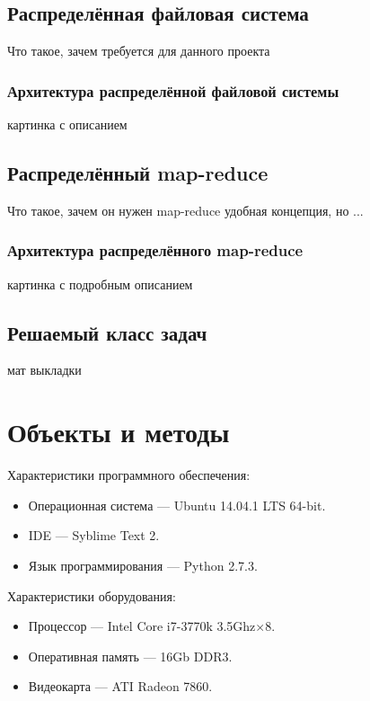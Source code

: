 \documentclass[12pt,a4paper,oneside]{extarticle}
\begin{document}
    \subsection{Распределённая файловая система}
        Что такое, зачем требуется для данного проекта
        \subsubsection{Архитектура распределённой файловой системы}
            картинка с описанием
    \clearpage
    \subsection{Распределённый map-reduce}
        Что такое, зачем он нужен
        map-reduce удобная концепция, но ...
        
        \subsubsection{Архитектура распределённого map-reduce}
            картинка с подробным описанием
    \clearpage

    \subsection{Решаемый класс задач}
        мат выкладки
    \clearpage
\clearpage

\section{Объекты и методы}      
        \noindent Характеристики программного обеспечения:
        \begin{itemize}
            \item Операционная система --- Ubuntu 14.04.1 LTS 64-bit.
            \item IDE --- Syblime Text 2.
            \item Язык программирования --- Python 2.7.3.
        \end{itemize}
        
        \noindent Характеристики оборудования:
        \begin{itemize}
            \item Процессор --- Intel Core i7-3770k 3.5Ghz$\times$8.
            \item Оперативная память --- 16Gb DDR3.
            \item Видеокарта --- ATI Radeon 7860.
        \end{itemize}
\clearpage
\end{document}

